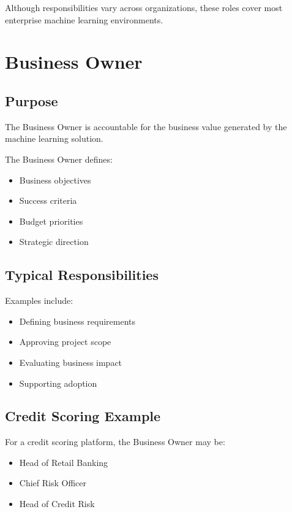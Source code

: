 Although responsibilities vary across organizations, these roles cover most enterprise machine learning environments.

\section{Business Owner}

\subsection{Purpose}

The Business Owner is accountable for the business value generated by the machine learning solution.

The Business Owner defines:

\begin{itemize}
    \item Business objectives
    \item Success criteria
    \item Budget priorities
    \item Strategic direction
\end{itemize}

\subsection{Typical Responsibilities}

Examples include:

\begin{itemize}
    \item Defining business requirements
    \item Approving project scope
    \item Evaluating business impact
    \item Supporting adoption
\end{itemize}

\subsection{Credit Scoring Example}

For a credit scoring platform, the Business Owner may be:

\begin{itemize}
    \item Head of Retail Banking
    \item Chief Risk Officer
    \item Head of Credit Risk
\end{itemize}

